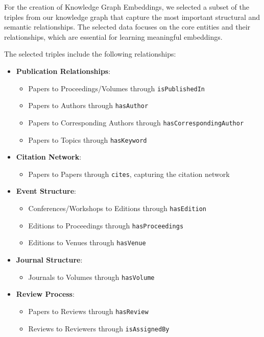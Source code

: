 \documentclass[10pt,a4paper]{article}
\begin{document}
For the creation of Knowledge Graph Embeddings, we selected a subset of the triples from our knowledge graph that capture the most important structural and semantic relationships. The selected data focuses on the core entities and their relationships, which are essential for learning meaningful embeddings.

The selected triples include the following relationships:

\begin{itemize}
    \item \textbf{Publication Relationships}:
    \begin{itemize}
        \item Papers to Proceedings/Volumes through \texttt{isPublishedIn}
        \item Papers to Authors through \texttt{hasAuthor}
        \item Papers to Corresponding Authors through \texttt{hasCorrespondingAuthor}
        \item Papers to Topics through \texttt{hasKeyword}
    \end{itemize}
    
    \item \textbf{Citation Network}:
    \begin{itemize}
        \item Papers to Papers through \texttt{cites}, capturing the citation network
    \end{itemize}
    
    \item \textbf{Event Structure}:
    \begin{itemize}
        \item Conferences/Workshops to Editions through \texttt{hasEdition}
        \item Editions to Proceedings through \texttt{hasProceedings}
        \item Editions to Venues through \texttt{hasVenue}
    \end{itemize}
    
    \item \textbf{Journal Structure}:
    \begin{itemize}
        \item Journals to Volumes through \texttt{hasVolume}
    \end{itemize}
    
    \item \textbf{Review Process}:
    \begin{itemize}
        \item Papers to Reviews through \texttt{hasReview}
        \item Reviews to Reviewers through \texttt{isAssignedBy}
    \end{itemize}
\end{itemize}
\end{document}
